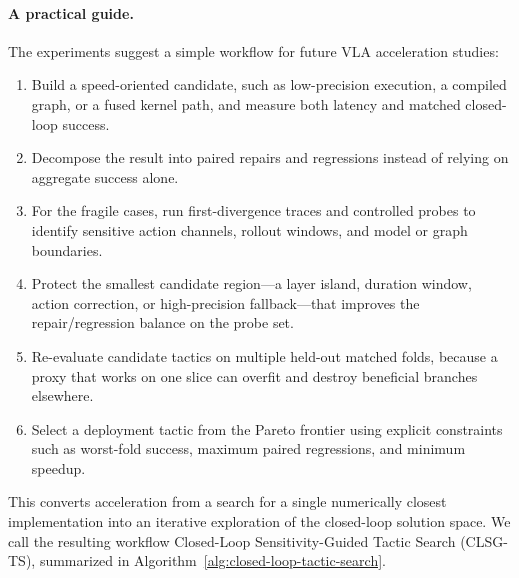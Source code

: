 \documentclass[10pt]{article}
\begin{document}
\paragraph{A practical guide.}
The experiments suggest a simple workflow for future VLA acceleration studies:
\begin{enumerate}
    \item Build a speed-oriented candidate, such as low-precision execution, a compiled graph, or a fused kernel path, and measure both latency and matched closed-loop success.
    \item Decompose the result into paired repairs and regressions instead of relying on aggregate success alone.
    \item For the fragile cases, run first-divergence traces and controlled probes to identify sensitive action channels, rollout windows, and model or graph boundaries.
    \item Protect the smallest candidate region---a layer island, duration window, action correction, or high-precision fallback---that improves the repair/regression balance on the probe set.
    \item Re-evaluate candidate tactics on multiple held-out matched folds, because a proxy that works on one slice can overfit and destroy beneficial branches elsewhere.
    \item Select a deployment tactic from the Pareto frontier using explicit constraints such as worst-fold success, maximum paired regressions, and minimum speedup.
\end{enumerate}
This converts acceleration from a search for a single numerically closest implementation into an iterative exploration of the closed-loop solution space. We call the resulting workflow Closed-Loop Sensitivity-Guided Tactic Search (CLSG-TS), summarized in Algorithm~\ref{alg:closed-loop-tactic-search}.
\end{document}
